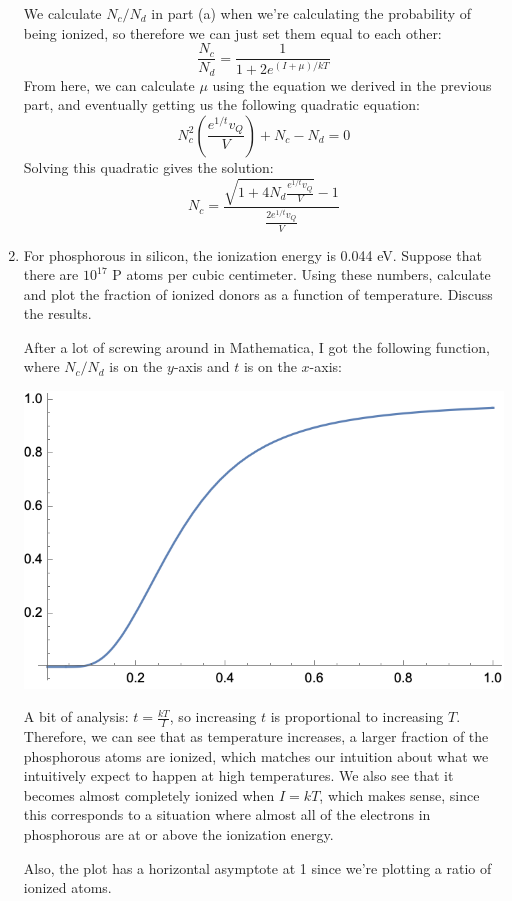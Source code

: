 \documentclass[10pt]{article}
\begin{document}
\begin{enumerate}[label=\alph*)]
			\begin{solution}
				We calculate \( N_c / N_d \) in part (a) when we're calculating the probability of being 
				ionized, so therefore we can just set them equal to each other:
				\[
					\frac{N_c}{N_d} = \frac{1}{1 + 2e^{(I + \mu) / kT}}
				\]
				From here, we can calculate \( \mu \) using the equation we derived in the previous part, and 
				eventually getting us the following quadratic equation:
				\[
				N_c^2 \left( \frac{e^{1 / t}v_Q}{V} \right) + N_c - N_d = 0
				\] 
				Solving this quadratic gives the solution:
				\[
				N_c = \frac{\sqrt{1 + 4N_d \frac{e^{1 / t} v_Q}{V}}  - 1}{\frac{2e^{1 / t} v_Q}{V}}
				\] 
			\end{solution}
		\item For phosphorous in silicon, the ionization energy is 0.044 eV. Suppose that 
			there are \(10^{17}\) P atoms per cubic centimeter. Using these numbers, calculate and plot the 
			fraction of ionized donors as a function of temperature. Discuss the results.

			\begin{solution}
				After a lot of screwing around in Mathematica, I got the following function, where 
				\( N_c / N_d \) is on the \( y \)-axis and \( t \) is on the \( x \)-axis:
				\begin{center}
					\includegraphics{q2d.png}
				\end{center}
				A bit of analysis: \( t = \frac{kT}{I}\), so increasing \( t \) is proportional 
				to increasing
				\( T \). Therefore, we can see that as temperature increases, a larger fraction of the 
				phosphorous atoms are ionized, which matches our intuition about what we intuitively 
				expect to happen at high temperatures. We also see that it becomes almost completely 
				ionized when \( I = kT \), which makes sense, since this corresponds to a situation where 
				almost all of the electrons in phosphorous are at or above the ionization energy.

				Also, the plot has a horizontal asymptote at 1 since we're plotting a ratio of ionized atoms.   
			\end{solution}
	\end{enumerate}
	\pagebreak
\end{document}
